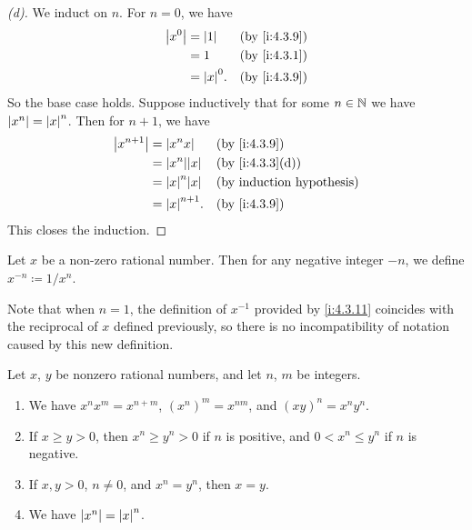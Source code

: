 \begin{proof}[(d)]
  We induct on \(n\).
  For \(n = 0\), we have
  \begin{align*}
    \abs{x^0} & = \abs{1}    &  & \by{i:4.3.9} \\
              & = 1          &  & \by{i:4.3.1} \\
              & = \abs{x}^0. &  & \by{i:4.3.9}
  \end{align*}
  So the base case holds.
  Suppose inductively that for some \(n \in \mathbb{N}\) we have \(\left\lvert x^n\right\rvert = \left\lvert x\right\rvert^n\).
  Then for \(n + 1\), we have
  \begin{align*}
    \abs{x^{n + 1}} & = \abs{x^n x}       &  & \by{i:4.3.9}    \\
                    & = \abs{x^n} \abs{x} &  & \by{i:4.3.3}[d] \\
                    & = \abs{x}^n \abs{x} &  & \byIH           \\
                    & = \abs{x}^{n + 1}.  &  & \by{i:4.3.9}
  \end{align*}
  This closes the induction.
\end{proof}

\begin{defn}\label{i:4.3.11}
  Let \(x\) be a non-zero rational number.
  Then for any negative integer \(-n\), we define \(x^{-n} \coloneqq 1 / x^n\).

  Note that when \(n = 1\), the definition of \(x^{-1}\) provided by \cref{i:4.3.11} coincides with the reciprocal of \(x\) defined previously, so there is no incompatibility of notation caused by this new definition.
\end{defn}

\begin{prop}\label{i:4.3.12}
  Let \(x\), \(y\) be nonzero rational numbers, and let \(n\), \(m\) be integers.
  \begin{enumerate}
    \item We have \(x^n x^m = x^{n + m}\), \((x^n)^m = x^{nm}\), and \((xy)^n = x^n y^n\).
    \item If \(x \geq y > 0\), then \(x^n \geq y^n > 0\) if \(n\) is positive, and \(0 < x^n \leq y^n\) if \(n\) is negative.
    \item If \(x, y > 0\), \(n \neq 0\), and \(x^n = y^n\), then \(x = y\).
    \item We have \(\left\lvert x^n\right\rvert = \left\lvert x\right\rvert^n\).
  \end{enumerate}
\end{prop}

